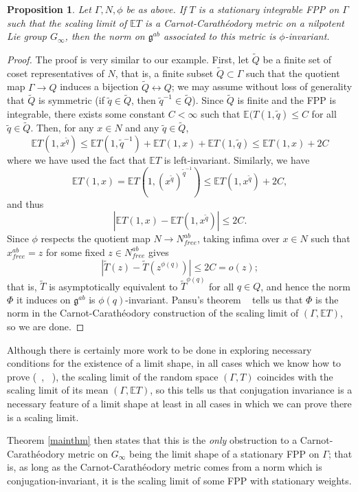 \documentclass[12pt,reqno]{article}
\numberwithin{equation}{section}
\newcommand{\E}{\mathbb{E}}
\newcommand{\g}{\mathfrak{g}}
\newtheorem{prop}{Proposition}
\begin{document}
\begin{prop}
Let $\Gamma, N, \phi$ be as above. If $T$ is a stationary integrable FPP on $\Gamma$ such that the scaling limit of $\E T$ is a Carnot-Carath\'eodory metric on a nilpotent Lie group $G_{\infty}$, then the norm on $\g^{ab}$ associated to this metric is $\phi$-invariant.
\end{prop}
\begin{proof}
The proof is very similar to our example. First, let $\tilde{Q}$ be a finite set of coset representatives of $N$, that is, a finite subset 
$\tilde{Q} \subset \Gamma$
such that the quotient map $\Gamma \to Q$ induces a bijection $\tilde{Q} \leftrightarrow Q$; we may assume without loss of generality that
$\tilde{Q}$ is symmetric (if $\tilde{q} \in \tilde{Q}$, then $\tilde{q}^{-1} \in \tilde{Q}$). Since $\tilde{Q}$ is finite and the FPP
is integrable, there exists some constant $C < \infty$ such that $\E(T(1,\tilde{q}) \le C$ for all $\tilde{q} \in \tilde{Q}$. Then, for any $x \in N$
and any $\tilde{q} \in \tilde{Q}$,
\[ \E T(1, x^{\tilde{q}}) \le \E T(1,\tilde{q}^{-1}) + \E T(1,x) + \E T(1, \tilde{q}) \le \E T(1, x) + 2C \]
where we have used the fact that $\E T$ is left-invariant. Similarly, we have
\[ \E T(1, x) = \E T(1, (x^{\tilde{q}})^{\tilde{q}^{-1}}) \le \E T(1, x^{\tilde{q}}) + 2C, \]
and thus
\[ | \E T(1,x) - \E T(1,x^{\tilde{q}}) | \le 2 C. \]
Since $\phi$ respects the quotient map $N \to N^{ab}_{free}$, 
taking infima over $x \in N$ such that $x^{ab}_{free} = z$ for some fixed $z \in N^{ab}_{free}$ gives
\[ | \tilde{T}(z) - \tilde{T}(z^{\phi(q)}) | \le 2 C = o(z); \]
that is, $\tilde{T}$ is asymptotically equivalent to $\tilde{T}^{\phi(q)}$ for all $q \in Q$, and hence the norm $\Phi$ it induces on $\g^{ab}$
is $\phi(q)$-invariant. 
Pansu's theorem ~\cite{Pansu} tells us that $\Phi$ is the norm in the Carnot-Carath\'eodory construction of the scaling limit
of $(\Gamma, \E T)$, so we are done.
\end{proof}

Although there is certainly more work to be done in exploring necessary conditions for the existence of a limit shape, in all cases which we know
how to prove (~\cite{BenjaminiTessera}, ~\cite{CantrellFurman}), the scaling limit of the random space $(\Gamma, T)$ coincides
with the scaling limit of its mean $(\Gamma, \E T)$, so this tells us that conjugation invariance is a necessary feature of a limit shape
at least in all cases in which we can prove there is a scaling limit.

Theorem \ref{mainthm} then states that this is the \emph{only} obstruction to a Carnot-Carath\'eodory metric on $G_{\infty}$ 
being the limit shape of a stationary FPP on $\Gamma$; that is, as long as the Carnot-Carath\'eodory metric comes from a norm
which is conjugation-invariant, it is the scaling limit of some FPP with stationary weights.
\end{document}
